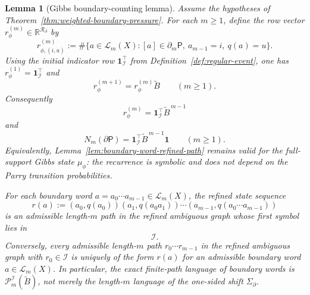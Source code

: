 \documentclass{etds}%
\numberwithin{equation}{section}
\theoremstyle{plain}
\newtheorem{lemma}[theorem]{Lemma}
\theoremstyle{definition}
\theoremstyle{remark}
\begin{document}
\begin{lemma}[Gibbs boundary-counting lemma]
\label{lem:gibbs-counting}
Assume the hypotheses of
Theorem~\ref{thm:weighted-boundary-pressure}.  For each $m\ge 1$, define the
row vector $r_\phi^{(m)}\in\mathbb{R}^{\mathcal{R}_\partial}$ by
\[
r_{\phi,(i,u)}^{(m)}
:=\#\{a\in\mathcal{L}_m(X):[a]\in\partial_m\mathsf{P},\ a_{m-1}=i,\ q(a)=u\}.
\]
Using the initial indicator row
$\mathbf{1}_{\mathcal{I}}^{\!\top}$ from
Definition~\ref{def:regular-event}, one has
$r_\phi^{(1)}=\mathbf{1}_{\mathcal{I}}^{\!\top}$ and
\[
r_\phi^{(m+1)}=r_\phi^{(m)}\widetilde{B}\qquad(m\ge 1).
\]
Consequently
\[
r_\phi^{(m)}=\mathbf{1}_{\mathcal{I}}^{\!\top}\widetilde{B}^{\,m-1}
\]
and
\[
N_m(\partial\mathsf{P})
=\mathbf{1}_{\mathcal{I}}^{\!\top}\widetilde{B}^{\,m-1}\mathbf{1}
\qquad(m\ge 1).
\]
Equivalently, Lemma~\ref{lem:boundary-word-refined-path} remains valid for the
full-support Gibbs state $\mu_\phi$: the recurrence is symbolic and does not
depend on the Parry transition probabilities.

For each boundary word $a=a_0\cdots a_{m-1}\in\mathcal{L}_m(X)$, the refined
state sequence
\[
r(a):=(a_0,q(a_0))(a_1,q(a_0a_1))\cdots(a_{m-1},q(a_0\cdots a_{m-1}))
\]
is an admissible length-$m$ path in the refined ambiguous graph whose first
symbol lies in
\[
\mathcal{I}.
\]
Conversely, every admissible length-$m$ path $r_0\cdots r_{m-1}$ in the
refined ambiguous graph with $r_0\in\mathcal{I}$ is uniquely of the form
$r(a)$ for an admissible boundary word $a\in\mathcal{L}_m(X)$.
In particular, the exact finite-path language of boundary words is
$\mathcal{P}_m^{\mathcal{I}}(\widetilde{B})$, not merely the length-$m$
language of the one-sided shift $\Sigma_\partial$.
\end{lemma}
\end{document}

